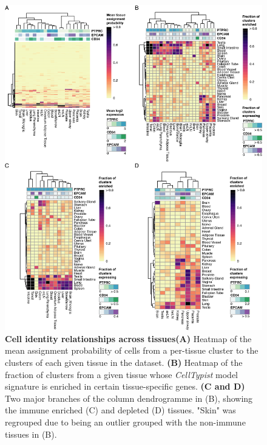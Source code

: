 \begin{figure}[pht!]
    \centering    
    \includegraphics[scale=0.75]{Chapter4/Figs/chap4_tissuefig.png} %
    \caption[Cell identity relationships across tissues]{\textbf{Cell identity relationships across tissues}\newline\textbf{(A)} Heatmap of the mean assignment probability of cells from a per-tissue cluster to the clusters of each given tissue in the dataset. \textbf{(B)} Heatmap of the fraction of clusters from a given tissue whose \textit{CellTypist} model signature is enriched in certain tissue-specific genes. \textbf{(C and D)} Two major branches of the column dendrogramme in (B), showing the immune enriched (C) and depleted (D) tissues. "Skin" was regrouped due to being an outlier grouped with the non-immune tissues in (B).}
    \label{fig:chap4_tiss}
\end{figure}

